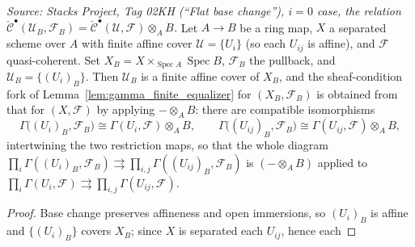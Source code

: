 \begin{lemma}
  \label{lem:base_changed_equalizer_diagram}
  \textit{Source: Stacks Project, Tag 02KH (``Flat base change''), $i=0$ case,
  the relation \(\check{\mathcal{C}}^\bullet(\mathcal{U}_B,\mathcal{F}_B) =
  \check{\mathcal{C}}^\bullet(\mathcal{U},\mathcal{F}) \otimes_A B\).}
  Let \(A \to B\) be a ring map, \(X\) a separated scheme over \(A\) with finite
  affine cover \(\mathcal{U} = \{U_i\}\) (so each \(U_{ij}\) is affine), and
  \(\mathcal{F}\) quasi-coherent. Set \(X_B = X \times_{\operatorname{Spec} A}
  \operatorname{Spec} B\), \(\mathcal{F}_B\) the pullback, and
  \(\mathcal{U}_B = \{(U_i)_B\}\). Then \(\mathcal{U}_B\) is a finite affine cover of
  \(X_B\), and the sheaf-condition fork of Lemma~\ref{lem:gamma_finite_equalizer} for
  \((X_B, \mathcal{F}_B)\) is obtained from that for \((X, \mathcal{F})\) by applying
  \(- \otimes_A B\): there are compatible isomorphisms
  \[
    \Gamma\bigl((U_i)_B, \mathcal{F}_B\bigr) \cong \Gamma(U_i, \mathcal{F}) \otimes_A B,
    \qquad
    \Gamma\bigl((U_{ij})_B, \mathcal{F}_B\bigr) \cong \Gamma(U_{ij}, \mathcal{F}) \otimes_A B,
  \]
  intertwining the two restriction maps, so that the whole diagram
  \(\prod_i \Gamma((U_i)_B,\mathcal{F}_B) \rightrightarrows \prod_{i,j}
  \Gamma((U_{ij})_B,\mathcal{F}_B)\) is \((- \otimes_A B)\) applied to
  \(\prod_i \Gamma(U_i,\mathcal{F}) \rightrightarrows \prod_{i,j}
  \Gamma(U_{ij},\mathcal{F})\).
  \begin{proof}
    Base change preserves affineness and open immersions, so \((U_i)_B\) is affine and
    \(\{(U_i)_B\}\) covers \(X_B\); since \(X\) is separated each \(U_{ij}\), hence each

\end{proof}
\end{lemma}
